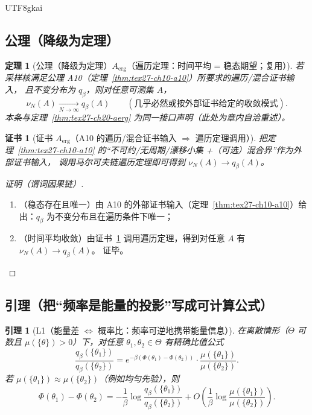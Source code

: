 \documentclass[12pt]{article}
\newtheorem{theorem}{定理}[section]
\newtheorem{lemma}{引理}[section]
\newtheorem{Certificate}{证书}[section]
\begin{document}
\begin{CJK*}{UTF8}{gkai}
\subsection{公理（降级为定理）}
\label{subsec:tex27-ch22-axioms}

\begin{theorem}[公理（降级为定理）$A_{\mathrm{erg}}$（遍历定理：时间平均 = 稳态期望；复用）]
\label{thm:tex27-ch22-aerg}
若采样核满足公理 A10（定理~\ref{thm:tex27-ch10-a10}）所要求的遍历/混合证书输入，
且不变分布为 $q_\beta$，则对任意可测集 $A$，
\[
  \nu_N(A)\xrightarrow[N\to\infty]{} q_\beta(A)
  \qquad
  (\text{几乎必然或按外部证书给定的收敛模式}).
\]
本条与定理~\ref{thm:tex27-ch20-aerg} 为同一接口声明（此处为章内自洽重述）。
\end{theorem}

\begin{Certificate}[证书 $A_{\mathrm{erg}}$（A10 的遍历/混合证书输入 $\Rightarrow$ 遍历定理调用）]
\label{cert:tex27-ch22-aerg}
把定理~\ref{thm:tex27-ch10-a10} 的“不可约/无周期/漂移小集 +（可选）混合界”作为外部证书输入，
调用马尔可夫链遍历定理即可得到
$\nu_N(A)\to q_\beta(A)$。
\end{Certificate}

\begin{proof}[证明（谓词因果链）]
\begin{enumerate}
  \item（稳态存在且唯一）由 A10 的外部证书输入（定理~\ref{thm:tex27-ch10-a10}）给出：$q_\beta$ 为不变分布且在遍历条件下唯一；
  \item（时间平均收敛）由证书~\ref{cert:tex27-ch22-aerg} 调用遍历定理，得到对任意 $A$ 有 $\nu_N(A)\to q_\beta(A)$。
  证毕。
\end{enumerate}
\end{proof}

\subsection{引理（把“频率是能量的投影”写成可计算公式）}
\label{subsec:tex27-ch22-lemmas}

\begin{lemma}[L1（能量差 $\Leftrightarrow$ 概率比：频率可逆地携带能量信息）]
\label{lem:tex27-ch22-l1}
在离散情形（$\Theta$ 可数且 $\mu(\{\theta\})>0$）下，对任意 $\theta_1,\theta_2\in\Theta$ 有精确比值公式
\[
  \frac{q_\beta(\{\theta_1\})}{q_\beta(\{\theta_2\})}
  =
  e^{-\beta(\Phi(\theta_1)-\Phi(\theta_2))}\cdot
  \frac{\mu(\{\theta_1\})}{\mu(\{\theta_2\})}.
\]
若 $\mu(\{\theta_1\})\approx\mu(\{\theta_2\})$（例如均匀先验），则
\[
  \Phi(\theta_1)-\Phi(\theta_2)
  =
  -\frac{1}{\beta}\log\frac{q_\beta(\{\theta_1\})}{q_\beta(\{\theta_2\})}
  +O\!\left(\frac{1}{\beta}\log\frac{\mu(\{\theta_1\})}{\mu(\{\theta_2\})}\right).
\]
\end{lemma}


\end{CJK*}
\end{document}

